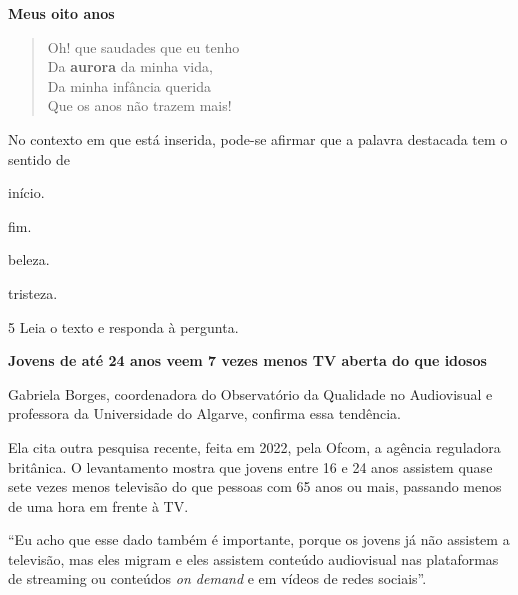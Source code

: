 \begin{myquote}
\begin{myescolha}
\begin{myquote}
\textbf{Meus oito anos}

\begin{verse}
Oh! que saudades que eu tenho\\
Da \textbf{aurora} da minha vida,\\
Da minha infância querida\\
Que os anos não trazem mais! 
\end{verse}

\end{myquote}

No contexto em que está inserida, pode-se afirmar que a palavra destacada
tem o sentido de

\begin{multicols}{2}
\begin{escolha}
  \item início.
  \item fim.
  \item beleza.
  \item tristeza.
\end{escolha} 
\end{multicols}

\num{5} Leia o texto e responda à pergunta.

\begin{myquote}
\textbf{Jovens de até 24 anos veem 7 vezes menos TV aberta do que idosos}

Gabriela Borges, coordenadora do Observatório da Qualidade no
Audiovisual e professora da Universidade do Algarve, confirma essa
tendência.

Ela cita outra pesquisa recente, feita em 2022, pela Ofcom, a agência
reguladora britânica. O levantamento mostra que jovens entre 16 e 24
anos assistem quase sete vezes menos televisão do que pessoas com 65
anos ou mais, passando menos de uma hora em frente à TV.

``Eu acho que esse dado também é importante, porque os jovens já não
assistem a televisão, mas eles migram e eles assistem conteúdo
audiovisual nas plataformas de streaming ou conteúdos \textit{on demand}
e em vídeos de redes sociais''.

\end{myquote}


\end{myescolha}
\end{myquote}
